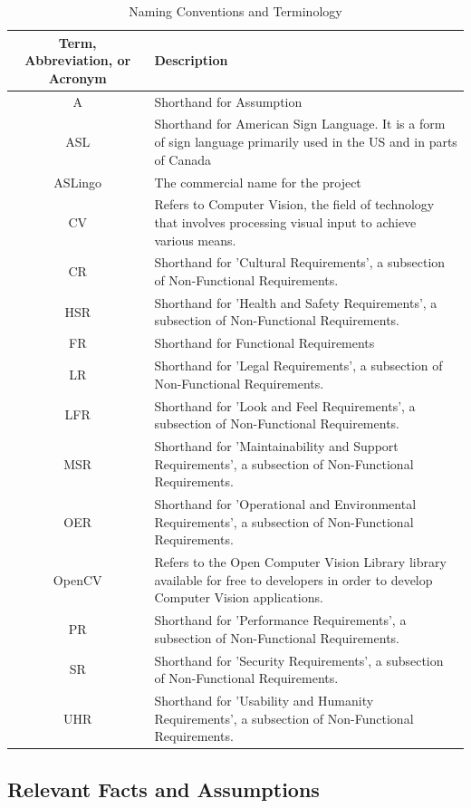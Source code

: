 \documentclass[12pt, titlepage]{article}
\begin{document}
\begin{longtable}{| c | p{7cm} |}
\caption{Naming Conventions and Terminology} \\
\hline
\textbf{Term, Abbreviation, or Acronym} & \textbf{Description}\\
\hline
A & Shorthand for Assumption\\
\hline
ASL & Shorthand for American Sign Language. It is a form of sign language primarily used in the US and in parts of Canada\\
\hline
ASLingo & The commercial name for the project\\
\hline
CV & Refers to Computer Vision, the field of technology that involves processing visual input to achieve various means.\\
\hline
CR & Shorthand for 'Cultural Requirements', a subsection of Non-Functional Requirements.\\
\hline
HSR & Shorthand for 'Health and Safety Requirements', a subsection of Non-Functional Requirements.\\
\hline
FR & Shorthand for Functional Requirements\\
\hline
LR & Shorthand for 'Legal Requirements', a subsection of Non-Functional Requirements.\\
\hline
LFR & Shorthand for 'Look and Feel Requirements', a subsection of Non-Functional Requirements.\\
\hline
MSR & Shorthand for 'Maintainability and Support Requirements', a subsection of Non-Functional Requirements.\\
\hline
OER & Shorthand for 'Operational and Environmental Requirements', a subsection of Non-Functional Requirements.\\
\hline
OpenCV & Refers to the Open Computer Vision Library library available for free to developers in order to develop Computer Vision applications.\\
\hline
PR & Shorthand for 'Performance Requirements', a subsection of Non-Functional Requirements.\\
\hline
SR & Shorthand for 'Security Requirements', a subsection of Non-Functional Requirements.\\
\hline
UHR & Shorthand for 'Usability and Humanity Requirements', a subsection of Non-Functional Requirements.\\
\bottomrule
\end{longtable}

\subsection{Relevant Facts and Assumptions}
\end{document}
